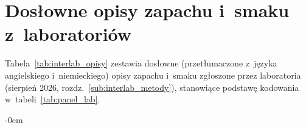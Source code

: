 \documentclass[foods,article,submit,moreauthors]{Definitions/mdpi}
\begin{document}




\vspace{6pt}


\appendixstart
\appendix
\section[\appendixname~\thesection]{Dosłowne opisy zapachu i~smaku z~laboratoriów}
\label{app:interlab_raw}

Tabela~\ref{tab:interlab_opisy} zestawia dosłowne (przetłumaczone z~języka
angielskiego i~niemieckiego) opisy zapachu i~smaku zgłoszone przez laboratoria
(sierpień 2026, rozdz.~\ref{sub:interlab_metody}), stanowiące podstawę
kodowania w~tabeli~\ref{tab:panel_lab}.



\begin{adjustwidth}{-\extralength}{0cm}



\PublishersNote{}
\end{adjustwidth}
\end{document}
